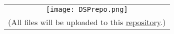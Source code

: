 \documentclass[UTF8,scheme=plain,linespread=1.3,zihao=-4,fontset=adobe]{ctexart}
\begin{document}
    \begingroup
    \tableofcontents
    \endgroup
    \clearpage


    \setcounter{page}{1} 

    

    

    \vspace{\fill}
    \hfill
    \begin{tabular}{c}
        \texttt{[image: DSPrepo.png]} \\
        \scriptsize (All files will be uploaded to this \href{https://github.com/iChunyu/signal-process-demo}{repository}.)
    \end{tabular}

    \clearpage
    \appendix

    
\end{document}
